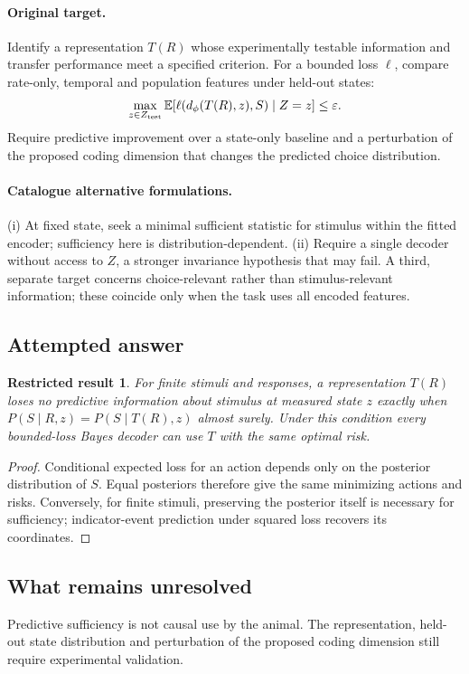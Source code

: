 \documentclass[11pt]{article}
\newcommand{\E}{\mathbb E}
\providecommand{\E}{\mathbb E}
\newtheorem{attemptresult}{Restricted result}[section]
\begin{document}
\paragraph{Original target.}
Identify a representation $T(R)$ whose experimentally testable information and transfer performance meet a specified criterion. For a bounded loss $\ell$, compare rate-only, temporal and population features under held-out states:
\[
\max_{z\in Z_{\rm test}}\E[\ell(d_\phi(T(R),z),S)\mid Z=z]\leq\varepsilon.
\]
Require predictive improvement over a state-only baseline and a perturbation of the proposed coding dimension that changes the predicted choice distribution.
\paragraph{Catalogue alternative formulations.}
(i) At fixed state, seek a minimal sufficient statistic for stimulus within the fitted encoder; sufficiency here is distribution-dependent. (ii) Require a single decoder without access to $Z$, a stronger invariance hypothesis that may fail. A third, separate target concerns choice-relevant rather than stimulus-relevant information; these coincide only when the task uses all encoded features.
\subsection{Attempted answer}
\begin{attemptresult}
For finite stimuli and responses, a representation $T(R)$ loses no predictive information about stimulus at measured state $z$ exactly when $P(S\mid R,z)=P(S\mid T(R),z)$ almost surely. Under this condition every bounded-loss Bayes decoder can use $T$ with the same optimal risk.
\end{attemptresult}
\begin{proof}
Conditional expected loss for an action depends only on the posterior distribution of $S$. Equal posteriors therefore give the same minimizing actions and risks. Conversely, for finite stimuli, preserving the posterior itself is necessary for sufficiency; indicator-event prediction under squared loss recovers its coordinates.
\end{proof}
\subsection{What remains unresolved}
Predictive sufficiency is not causal use by the animal. The representation, held-out state distribution and perturbation of the proposed coding dimension still require experimental validation.
\end{document}
